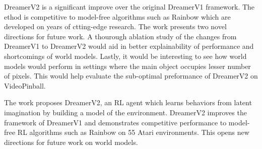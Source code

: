 \documentclass[11pt,letterpaper]{article}
\begin{document}
DreamerV2 is a significant improve over the original DreamerV1 framework. The ethod is competitive to model-free algorithms such as Rainbow which are developed on years of ctting-edge research. The work presents two novel directions for future work. A thourough ablation study of the changes from DreamerV1 to DreamerV2 would aid in better explainability of performance and shortcomings of world models. Lastly, it would be interesting to see how world models would perform in settings where the main object occupies lesser number of pixels. This would help evaluate the sub-optimal preformance of DreamerV2 on VideoPinball. 

The work proposes DreamerV2, an RL agent which learns behaviors from latent imagination by building a model of the environment. DreamerV2 improves the framework of DreamerV1 and demonstrates competitive performance to model-free RL algorithms such as Rainbow on 55 Atari environments. This opens new directions for future work on world models. 
\end{document}
